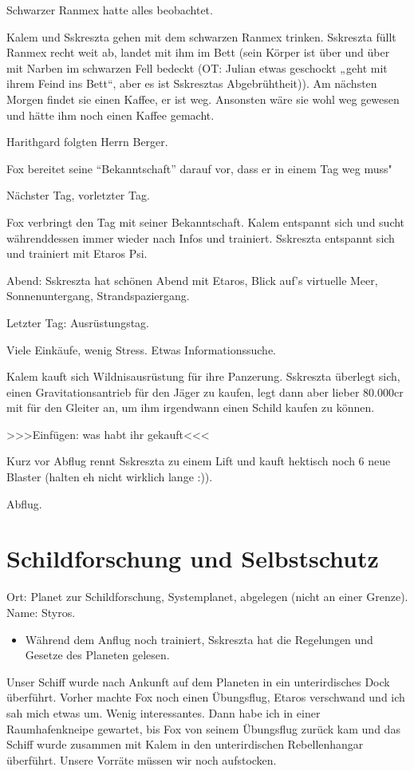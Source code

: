 \documentclass[11pt]{scrartcl}
\begin{document}
Schwarzer Ranmex hatte alles beobachtet.

Kalem und Sskreszta gehen mit dem schwarzen Ranmex trinken. Sskreszta
füllt Ranmex recht weit ab, landet mit ihm im Bett (sein Körper ist über
und über mit Narben im schwarzen Fell bedeckt (OT: Julian etwas
geschockt „geht mit ihrem Feind ins Bett``, aber es ist Sskresztas
Abgebrühtheit)). Am nächsten Morgen findet sie einen Kaffee, er ist weg.
Ansonsten wäre sie wohl weg gewesen und hätte ihm noch einen Kaffee
gemacht.

Harithgard folgten Herrn Berger.

Fox bereitet seine ``Bekanntschaft'' darauf vor, dass er in einem Tag
weg muss"

Nächster Tag, vorletzter Tag.

Fox verbringt den Tag mit seiner Bekanntschaft. Kalem entspannt sich und
sucht währenddessen immer wieder nach Infos und trainiert. Sskreszta
entspannt sich und trainiert mit Etaros Psi.

Abend: Sskreszta hat schönen Abend mit Etaros, Blick auf's virtuelle
Meer, Sonnenuntergang, Strandspaziergang.

Letzter Tag: Ausrüstungstag.

Viele Einkäufe, wenig Stress. Etwas Informationssuche.

Kalem kauft sich Wildnisausrüstung für ihre Panzerung. Sskreszta
überlegt sich, einen Gravitationsantrieb für den Jäger zu kaufen, legt
dann aber lieber 80.000cr mit für den Gleiter an, um ihm irgendwann
einen Schild kaufen zu können.

\textgreater{}\textgreater{}\textgreater{}Einfügen: was habt ihr
gekauft\textless{}\textless{}\textless{}

Kurz vor Abflug rennt Sskreszta zu einem Lift und kauft hektisch noch 6
neue Blaster (halten eh nicht wirklich lange :)).

Abflug.

\section{Schildforschung und Selbstschutz}

Ort: Planet zur Schildforschung, Systemplanet, abgelegen (nicht an einer
Grenze). Name: Styros.

\begin{itemize}
\item
  Während dem Anflug noch trainiert, Sskreszta hat die Regelungen und
  Gesetze des Planeten gelesen.
\end{itemize}
Unser Schiff wurde nach Ankunft auf dem Planeten in ein unterirdisches
Dock überführt. Vorher machte Fox noch einen Übungsflug, Etaros
verschwand und ich sah mich etwas um. Wenig interessantes. Dann habe ich
in einer Raumhafenkneipe gewartet, bis Fox von seinem Übungsflug zurück
kam und das Schiff wurde zusammen mit Kalem in den unterirdischen
Rebellenhangar überführt. Unsere Vorräte müssen wir noch aufstocken.
\end{document}

